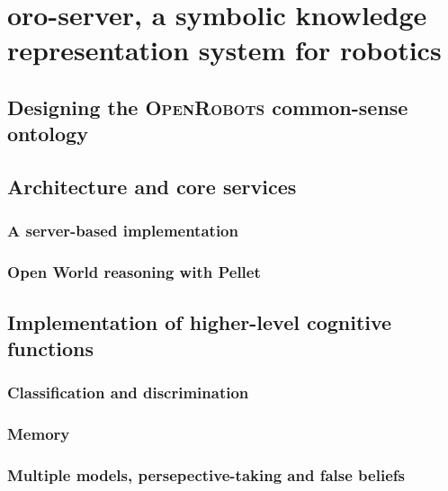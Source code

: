 \chapter{oro-server, a symbolic knowledge representation system for robotics}
\label{chapter|oroserver}

\section{Designing the \textsc{OpenRobots} common-sense ontology}
\label{sect|commonsense-design}

\section{ Architecture and core services}
\label{sect|oro-core}

\subsection{ A server-based implementation}
\label{sect|oro-serverbased}

\subsection{ Open World reasoning with Pellet}
\label{sect|oro-serverbased}


\section{ Implementation of higher-level cognitive functions}
\label{sect|high-level-cognition}

\subsection{Classification and discrimination}
\label{subssect|discrimination}

\subsection{Memory}
\label{subssect|memory}

\subsection{Multiple models, persepective-taking and false beliefs}
\label{subssect|alterite}
